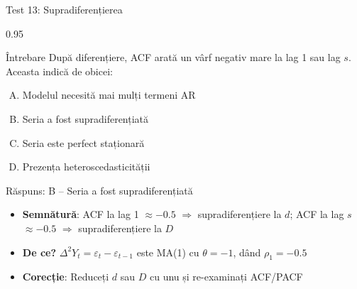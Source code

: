 \documentclass[9pt, aspectratio=169, t]{beamer}
\begin{document}
\begin{frame}{Test 13: Supradiferențierea}
    \begin{cminipage}{0.95\textwidth}
    \begin{alertblock}{Întrebare}
        După diferențiere, ACF arată un vârf negativ mare la lag 1 sau lag $s$. Aceasta indică de obicei:
    \end{alertblock}

    \vspace{0.3cm}

    \begin{enumerate}[A)]\setlength{\itemsep}{0pt}
        \item Modelul necesită mai mulți termeni AR
        \item Seria a fost supradiferențiată
        \item Seria este perfect staționară
        \item Prezența heteroscedasticității
    \end{enumerate}

    \vspace{0.5cm}
    \pause
    \begin{exampleblock}{Răspuns: B -- Seria a fost supradiferențiată}
        {\footnotesize
        \begin{itemize}\setlength{\itemsep}{0pt}
        \item \textbf{Semnătură}: ACF la lag 1 $\approx -0.5$ $\Rightarrow$ supradiferențiere la $d$; ACF la lag $s$ $\approx -0.5$ $\Rightarrow$ supradiferențiere la $D$
        \item \textbf{De ce?} $\Delta^2 Y_t = \varepsilon_t - \varepsilon_{t-1}$ este MA(1) cu $\theta = -1$, dând $\rho_1 = -0.5$
        \item \textbf{Corecție}: Reduceți $d$ sau $D$ cu unu și re-examinați ACF/PACF
        \end{itemize}
        }
    \end{exampleblock}
    \end{cminipage}
\end{frame}
\end{document}
